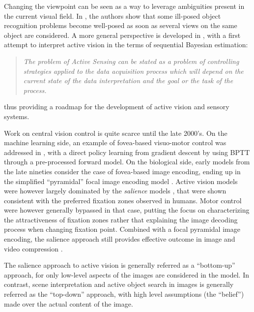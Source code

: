 \documentclass[12pt,twoside,openright]{article}
\begin{document}
Changing the viewpoint can be seen as a way to leverage ambiguities present in the current visual field. In \citet{aloimonos1988active}, the authors show that some ill-posed object recognition problems become well-posed as soon as several views on the  same object are considered. A more general perspective is developed in \citet{bajcsy1988active}, with a first attempt to interpret active vision in the terms of sequential Bayesian estimation:
\begin{quote}
	\emph{The problem  of Active Sensing can be stated as a problem of controlling strategies 
		applied to the data acquisition process which will depend on the current state 
		of the data interpretation and  the  goal  or the  task of  the  process.}
\end{quote}
thus providing a roadmap for the development of active vision and sensory systems.

Work on central vision control is quite scarce until the late 2000's.
On the machine learning side, an example of fovea-based visuo-motor control was  addressed in \citet{schmidhuber1991learning}, with a direct policy learning from gradient descent by using BPTT through a pre-processed forward model. 
On the biological  side, early models from the late nineties  consider the case of fovea-based image encoding, ending up in the simplified ``pyramidal'' focal image encoding model \citep{kortum1996implementation}. Active vision models were however largely dominated by the \emph{salience} models \citep{itti2000saliency, itti2001computational, itti2005bayesian}, that were shown consistent with the preferred fixation zones observed in humans. 
Motor control were however generally bypassed in that case, putting the focus on characterizing the attractiveness of fixation zones rather that explaining 
the image decoding process when changing fixation point.
Combined with a focal pyramidal image encoding, the salience approach still provides effective outcome in image and video compression  \citep{wang2003foveation,guo2010novel}.


The salience approach to active vision is generally referred as a ``bottom-up'' approach, for only low-level aspects of the images are considered in the model. In contrast, scene interpretation and active object search in images is generally referred as the ``top-down'' approach, with high level assumptions (the ``belief'') made over the actual content of the image. 
\end{document}
